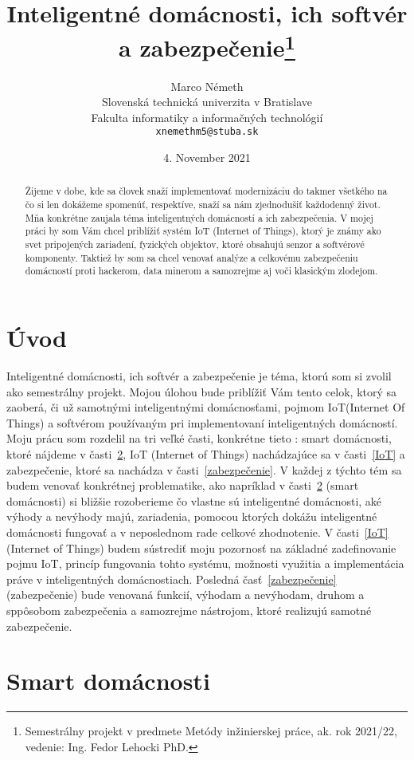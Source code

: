 \documentclass[10pt,twoside,slovak,a4paper]{article}
\title{Inteligentné domácnosti, ich softvér a zabezpečenie\thanks{Semestrálny projekt v predmete Metódy inžinierskej práce, ak. rok 2021/22, vedenie: Ing. Fedor Lehocki PhD.}} %
\author{Marco Németh\\[2pt]
	{\small Slovenská technická univerzita v Bratislave}\\
	{\small Fakulta informatiky a informačných technológií}\\
	{\small \texttt{xnemethm5@stuba.sk}}
	}
\date{\small 4. November 2021} %
\begin{document}
\maketitle

\begin{abstract}
Žijeme v dobe, kde sa človek snaží implementovať modernizáciu do takmer všetkého na čo si len dokážeme spomenúť, respektíve, snaží sa nám zjednodušiť každodenný život. Mňa konkrétne zaujala téma inteligentných domácností a ich zabezpečenia. V mojej práci by som Vám chcel priblížiť systém IoT (Internet of Things), ktorý je známy ako svet pripojených zariadení, fyzických objektov, ktoré obsahujú senzor a softvérové komponenty. Taktiež by som sa chcel venovať analýze a celkovému zabezpečeniu domácností proti hackerom, data minerom a samozrejme aj voči klasickým zlodejom.
\end{abstract}



\section{Úvod}

Inteligentné domácnosti, ich softvér a zabezpečenie je téma, ktorú som si zvolil ako semestrálny projekt. Mojou úlohou bude priblížiť Vám tento celok, ktorý sa zaoberá, či už samotnými inteligentnými domácnosťami, pojmom IoT(Internet Of Things) a softvérom používaným pri implementovaní inteligentných domácností. 
Moju prácu som rozdelil na tri veľké časti, konkrétne tieto : smart domácnosti, ktoré nájdeme v časti~\ref{domácnosti}, IoT (Internet of Things) nachádzajúce sa v časti~\ref{IoT}  a zabezpečenie, ktoré sa nachádza v časti~\ref{zabezpečenie}. V každej z týchto tém sa budem venovať konkrétnej problematike, ako napríklad v časti~\ref{domácnosti} (smart domácnosti) si bližšie rozoberieme čo vlastne sú inteligentné domácnosti, aké výhody a nevýhody majú, zariadenia, pomocou ktorých dokážu inteligentné domácnosti fungovať a v neposlednom rade celkové zhodnotenie. V časti~\ref{IoT} (Internet of Things) budem sústrediť moju pozornosť na základné zadefinovanie pojmu IoT, princíp fungovania tohto systému, možnosti využitia a implementácia práve v inteligentných domácnostiach. 
Posledná časť~\ref{zabezpečenie} (zabezpečenie) bude venovaná funkcií, výhodam a nevýhodam, druhom a sppôsobom zabezpečenia a samozrejme nástrojom, ktoré realizujú samotné zabezpečenie.


\section{Smart domácnosti}\label{domácnosti}
\end{document}
